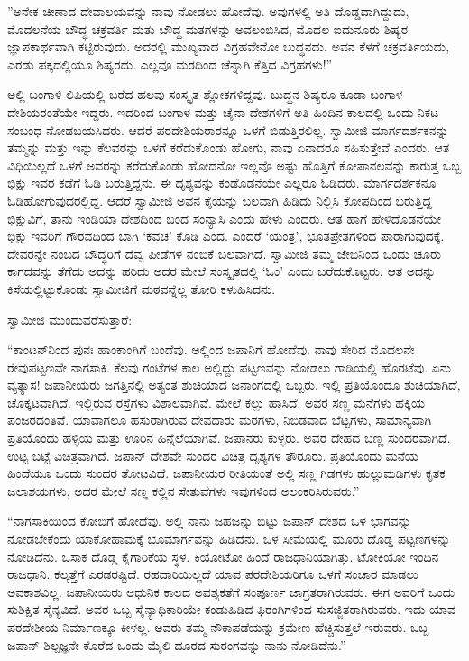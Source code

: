 ”ಅನೇಕ ಚೀಣಾದ ದೇವಾಲಯವನ್ನು ನಾವು ನೋಡಲು ಹೋದೆವು. ಅವುಗಳಲ್ಲಿ ಅತಿ ದೊಡ್ಡದಾಗಿದ್ದುದು, ಮೊದಲನೆಯ ಬೌದ್ಧ ಚಕ್ರವರ್ತಿ ಮತು ಬೌದ್ಧ ಮತಗಳನ್ನು ಅವಲಂಬಿಸಿದ, ಮೊದಲ ಐದುನೂರು ಶಿಷ್ಯರ ಜ್ಞಾಪಕಾರ್ಥವಾಗಿ ಕಟ್ಟಿರುವುದು. ಅದರಲ್ಲಿ ಮುಖ್ಯವಾದ ವಿಗ್ರಹವೇನೋ ಬುದ್ಧನದು. ಅವನ ಕೆಳಗೆ ಚಕ್ರವರ್ತಿಯದು, ಎರಡು ಪಕ್ಕದಲ್ಲಿಯೂ ಶಿಷ್ಯರದು. ಎಲ್ಲವೂ ಮರದಿಂದ ಚೆನ್ನಾಗಿ ಕೆತ್ತಿದ ವಿಗ್ರಹಗಳು!” 

 ಅಲ್ಲಿ ಬಂಗಾಳಿ ಲಿಪಿಯಲ್ಲಿ ಬರೆದ ಹಲವು ಸಂಸ್ಕೃತ ಶ್ಲೋಕಗಳಿದ್ದವು. ಬುದ್ಧನ ಶಿಷ್ಯರೂ ಕೂಡಾ ಬಂಗಾಳ ದೇಶಿಯರಂತೆಯೇ ಇದ್ದರು. ಇದರಿಂದ ಬಂಗಾಳ ಮತ್ತು ಚೈನಾ ದೇಶಗಳಿಗೆ ಅತಿ ಹಿಂದಿನ ಕಾಲದಲ್ಲಿ ಒಂದು ನಿಕಟ ಸಂಬಂಧ ನೋಡಬಯಸಿದರು. ಆದರೆ ಪರದೇಶಿಯರಾರನ್ನೂ ಒಳಗೆ ಬಿಡುತ್ತಿರಲಿಲ್ಲ. ಸ್ವಾಮೀಜಿ ಮಾರ್ಗದರ್ಶಕನನ್ನು ತಮ್ಮನ್ನು ಮತ್ತು ಇನ್ನು ಕೆಲವರನ್ನು ಒಳಗೆ ಕರೆದುಕೊಂಡು ಹೋಗು, ನಾವು ಏನಾದರೂ ಸಹಿಸುತ್ತೇವೆ ಎಂದರು. ಆತ ವಿಧಿಯಿಲ್ಲದೆ ಒಳಗೆ ಅವರನ್ನು ಕರೆದುಕೊಂಡು ಹೋದನೋ ಇಲ್ಲವೊ ಅಷ್ಟು ಹೊತ್ತಿಗೆ ಕೋಪಾನಲವನ್ನು ಕಾರುತ್ತ ಒಬ್ಬ ಭಿಕ್ಷು ಇವರ ಕಡೆಗೆ ಓಡಿ ಬರುತ್ತಿದ್ದನು. ಈ ದೃಶ್ಯವನ್ನು ಕಂಡೊಡನೆಯೇ ಎಲ್ಲರೂ ಓಡಿದರು. ಮಾರ್ಗದರ್ಶಕನೂ ಓಡಿಹೋಗುವುದರಲ್ಲಿದ್ದ. ಆದರೆ ಸ್ವಾಮೀಜಿ ಅವನ ಕೈಯನ್ನು ಬಲವಾಗಿ ಹಿಡಿದು ನಿಲ್ಲಿಸಿ ಕೋಪದಿಂದ ಬರುತ್ತಿದ್ದ ಭಿಕ್ಷುವಿಗೆ, ತಾನು ಇಂಡಿಯಾ ದೇಶದಿಂದ ಬಂದ ಸಂನ್ಯಾಸಿ ಎಂದು ಹೇಳು ಎಂದರು. ಆತ ಹಾಗೆ ಹೇಳಿದೊಡನೆಯೇ ಭಿಕ್ಷು ಇವರಿಗೆ ಗೌರವದಿಂದ ಬಾಗಿ ‘ಕವಚ’ ಕೊಡಿ ಎಂದ. ಎಂದರೆ ‘ಯಂತ್ರ’, ಭೂತಪ್ರೇತಗಳಿಂದ ಪಾರಾಗುವುದಕ್ಕೆ. ದೇವರನ್ನೇ ನಂಬದ ಬೌದ್ಧರಿಗೆ ದೆವ್ವ ಪೀಡೆಗಳ ನಂಬಿಕೆ ಬಲವಾಗಿದೆ. ಸ್ವಾಮೀಜಿ ತಮ್ಮ ಜೇಬಿನಿಂದ ಒಂದು ಚೂರು ಕಾಗದವನ್ನು ತೆಗೆದು ಅದನ್ನು ಹರಿದು ಅದರ ಮೇಲೆ ಸಂಸ್ಕೃತದಲ್ಲಿ ‘ಓಂ’ ಎಂದು ಬರೆದುಕೊಟ್ಟರು. ಆತ ಅದನ್ನು ಕಿಸೆಯಲ್ಲಿಟ್ಟುಕೊಂಡು ಸ್ವಾಮೀಜಿಗೆ ಮಠವನ್ನೆಲ್ಲ ತೋರಿ ಕಳುಹಿಸಿದನು. 

 ಸ್ವಾಮೀಜಿ ಮುಂದುವರೆಸುತ್ತಾರೆ:

 “ಕಾಂಟನ್‍ನಿಂದ ಪುನಃ ಹಾಂಕಾಂಗಿಗೆ ಬಂದೆವು. ಅಲ್ಲಿಂದ ಜಪಾನಿಗೆ ಹೋದೆವು. ನಾವು ಸೇರಿದ ಮೊದಲನೇ ರೇವುಪಟ್ಟಣವೇ ನಾಗಸಾಕಿ. ಕೆಲವು ಗಂಟೆಗಳ ಕಾಲ ಅಲ್ಲಿದ್ದು ಪಟ್ಟಣವನ್ನು ನೋಡಲು ಗಾಡಿಯಲ್ಲಿ ಹೊರಟೆವು. ಏನು ವ್ಯತ್ಯಾಸ! ಜಪಾನೀಯರು ಜಗತ್ತಿನಲ್ಲಿ ಅತ್ಯಂತ ಶುಚಿಯಾದ ಜನಾಂಗದಲ್ಲಿ ಒಬ್ಬರು. ಇಲ್ಲಿ ಪ್ರತಿಯೊಂದೂ ಶುಚಿಯಾಗಿದೆ, ಚೊಕ್ಕಟವಾಗಿದೆ. ಇಲ್ಲಿರುವ ರಸ್ತೆಗಳು ವಿಶಾಲವಾಗಿವೆ. ಮೇಲೆ ಕಲ್ಲು ಹಾಸಿದೆ. ಅವರ ಸಣ್ಣ ಮನೆಗಳು ಹಕ್ಕಿಯ ಪಂಜರದಂತಿವೆ. ಯಾವಾಗಲೂ ಹಸುರಾಗಿರುವ ದೇವದಾರು ಮರಗಳು, ನಿಬಿಡವಾದ ಬೆಟ್ಟಗಳು, ಸಾಮಾನ್ಯವಾಗಿ ಪ್ರತಿಯೊಂದು ಹಳ್ಳಿಯ ಮತ್ತು ಊರಿನ ಹಿನ್ನೆಲೆಯಾಗಿವೆ. ಜಪಾನರು ಕುಳ್ಳರು. ಅವರ ದೇಹದ ಬಣ್ಣ ಸುಂದರವಾಗಿದೆ. ಉಟ್ಟ ಬಟ್ಟೆ ವಿಚಿತ್ರವಾಗಿದೆ. ಜಪಾನ್ ದೇಶವೇ ಸುಂದರ ವಿಚಿತ್ರ ದೃಶ್ಯಗಳ ತೌರೂರು. ಪ್ರತಿಯೊಂದು ಮನೆಯ ಹಿಂದೆಯೂ ಒಂದು ಸುಂದರ ತೋಟವಿದೆ. ಜಪಾನೀಯರ ರೀತಿಯಂತೆ ಅಲ್ಲಿ ಸಣ್ಣ ಗಿಡಗಳು ಹುಲ್ಲುಮಡಿಗಳು ಕೃತಕ ಜಲಾಶಯಗಳು, ಅದರ ಮೇಲೆ ಸಣ್ಣ ಕಲ್ಲಿನ ಸೇತುವೆಗಳು ಇವುಗಳಿಂದ ಅಲಂಕರಿಸಿರುವರು.” 

 “ನಾಗಸಾಕಿಯಿಂದ ಕೋಬಿಗೆ ಹೋದೆವು. ಅಲ್ಲಿ ನಾನು ಜಹಜನ್ನು ಬಿಟ್ಟು ಜಪಾನ್ ದೇಶದ ಒಳ ಭಾಗವನ್ನು ನೋಡಬೇಕೆಂದು ಯಾಕೋಹಾಮಕ್ಕೆ ಭೂಮಾರ್ಗವನ್ನು ಹಿಡಿದೆನು. ಒಳ ಸೀಮೆಯಲ್ಲಿ ಮೂರು ದೊಡ್ಡ ಪಟ್ಟಣಗಳನ್ನು ನೋಡಿದೆನು. ಒಸಾಕ ದೊಡ್ಡ ಕೈಗಾರಿಕೆಯ ಸ್ಥಳ. ಕಿಯೋಟೋ ಹಿಂದೆ ರಾಜಧಾನಿಯಾಗಿತ್ತು. ಟೋಕಿಯೋ ಇಂದಿನ ರಾಜಧಾನಿ. ಕಲ್ಕತ್ತೆಗೆ ಎರಡರಷ್ಟಿದೆ. ರಹದಾರಿಯಿಲ್ಲದೆ ಯಾವ ಪರದೇಶಿಯರಿಗೂ ಒಳಗೆ ಸಂಚಾರ ಮಾಡಲು ಅವಕಾಶವಿಲ್ಲ. ಜಪಾನೀಯರು ಆಧುನಿಕ ಕಾಲದ ಅವಶ್ಯಕತೆಗೆ ಸಂಪೂರ್ಣ ಜಾಗ್ರತರಾಗಿರುವರು. ಈಗ ಅವರಿಗೆ ಒಂದು ಸುಶಿಕ್ಷಿತ ಸೈನ್ಯವಿದೆ. ಅವರ ಒಬ್ಬ ಸೈನ್ಯಾಧಿಕಾರಿಯೇ ಕಂಡುಹಿಡಿದ ಫಿರಂಗಿಗಳಿಂದ ಸುಸಜ್ಜಿತರಾಗಿರುವರು. ಇದು ಯಾವ ಪರದೇಶೀಯ ನಿರ್ಮಾಣಕ್ಕೂ ಕೀಳಲ್ಲ. ಅವರು ತಮ್ಮ ನೌಕಾಪಡೆಯನ್ನು ಕ್ರಮೇಣ ಹೆಚ್ಚಿಸುತ್ತಲೆ ಇರುವರು. ಒಬ್ಬ ಜಪಾನ್ ಶಿಲ್ಪಜ್ಞನೇ ಕೊರೆದ ಒಂದು ಮೈಲಿ ದೂರದ ಸುರಂಗವನ್ನು ನಾನು ನೋಡಿದೆನು.” 

